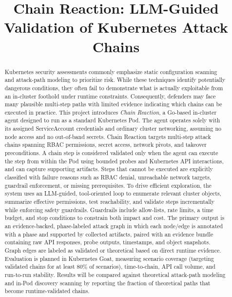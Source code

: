 \documentclass[conference]{IEEEtran}
\title{Chain Reaction: LLM-Guided Validation of Kubernetes Attack Chains}
\author{
\IEEEauthorblockN{Ashwin Charathsandran}
\IEEEauthorblockA{
FSCT-8611 Graduation Project\\
British Columbia Institute of Technology (BCIT)\\
Vancouver, BC, Canada
}
}
\begin{document}
\maketitle

\begin{abstract}
Kubernetes security assessments commonly emphasize static configuration scanning and attack-path modeling to prioritize risk. While these techniques identify potentially dangerous conditions, they often fail to demonstrate what is actually exploitable from an in-cluster foothold under runtime constraints. Consequently, defenders may face many plausible multi-step paths with limited evidence indicating which chains can be executed in practice.
\noindent
This project introduces \emph{Chain Reaction}, a Go-based in-cluster agent designed to run as a standard Kubernetes Pod. The agent operates solely with its assigned ServiceAccount credentials and ordinary cluster networking, assuming no node access and no out-of-band secrets. Chain Reaction targets multi-step attack chains spanning RBAC permissions, secret access, network pivots, and takeover preconditions. A chain step is considered validated only when the agent can execute the step from within the Pod using bounded probes and Kubernetes API interactions, and can capture supporting artifacts. Steps that cannot be executed are explicitly classified with failure reasons such as RBAC denial, unreachable network targets, guardrail enforcement, or missing prerequisites.
\noindent
To drive efficient exploration, the system uses an LLM-guided, tool-oriented loop to enumerate relevant cluster objects, summarize effective permissions, test reachability, and validate steps incrementally while enforcing safety guardrails. Guardrails include allow-lists, rate limits, a time budget, and stop conditions to constrain both impact and cost.
\noindent
The primary output is an evidence-backed, phase-labeled attack graph in which each node/edge is annotated with a phase and supported by collected artifacts, paired with an evidence bundle containing raw API responses, probe outputs, timestamps, and object snapshots. Graph edges are labeled as validated or theoretical based on direct runtime evidence. Evaluation is planned in Kubernetes Goat, measuring scenario coverage (targeting validated chains for at least 80\% of scenarios), time-to-chain, API call volume, and run-to-run stability. Results will be compared against theoretical attack-path modeling and in-Pod discovery scanning by reporting the fraction of theoretical paths that become runtime-validated chains.
\end{abstract}
\end{document}
